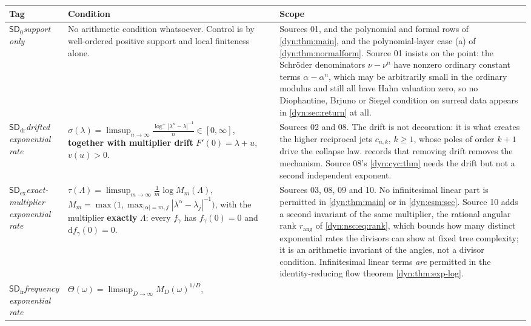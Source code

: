 \documentclass[11pt,letterpaper]{article}
\theoremstyle{definition}
\theoremstyle{remark}
\newcommand{\sdz}{\mathsf{SD}_{0}}
\newcommand{\sddr}{\mathsf{SD}_{\mathrm{dr}}}
\newcommand{\sdex}{\mathsf{SD}_{\mathrm{ex}}}
\newcommand{\sdfr}{\mathsf{SD}_{\mathrm{fr}}}
\newcommand{\rang}{r_{\mathrm{ang}}}
\numberwithin{equation}{section}
\begin{document}
\begin{longtable}{@{}P{0.12\textwidth}P{0.41\textwidth}P{0.40\textwidth}@{}}
\toprule
Tag & Condition & Scope\\
\midrule
\endhead
$\sdz$\newline \emph{support only}
&
No arithmetic condition whatsoever. Control is by well-ordered positive
support and local finiteness alone.
&
Sources 01, and the polynomial and formal rows of \cref{dyn:thm:main},
and the polynomial-layer case (a) of \cref{dyn:thm:normalform}. Source 01
insists on the point: the Schr\"oder denominators $\nu-\nu^{n}$ have
nonzero ordinary constant terms $\alpha-\alpha^{n}$, which may be
arbitrarily small in the ordinary modulus and still all have Hahn
valuation zero, so no Diophantine, Brjuno or Siegel condition on surreal
data appears in \cref{dyn:sec:return} at all.\\[4pt]
$\sddr$\newline \emph{drifted exponential rate}
&
$\displaystyle
\sigma(\lambda)=\limsup_{n\to\infty}
\frac{\log^{+}|\lambda^{n}-\lambda|^{-1}}{n}\in[0,\infty]$,
\textbf{together with multiplier drift} $F'(0)=\lambda+u$,
$v(u)>0$.
&
Sources 02 and 08. The drift is not decoration: it is what creates the
higher reciprocal jets $c_{n,k}$, $k\ge1$, whose poles of order $k+1$ drive
the collapse law.  records that removing drift removes
the mechanism. Source 08's \cref{dyn:cyc:thm} needs the drift but not a
second independent exponent.\\[4pt]
$\sdex$\newline \emph{exact-multiplier exponential rate}
&
$\displaystyle
\tau(\Lambda)=\limsup_{m\to\infty}\frac1m\log M_{m}(\Lambda)$,
$M_{m}=\max\bigl(1,\max_{|\alpha|=m,j}|\lambda^{\alpha}-\lambda_j|^{-1}\bigr)$,
with the multiplier \textbf{exactly} $\Lambda$: every
$f_\gamma$ has $f_\gamma(0)=0$ and $\mathrm df_\gamma(0)=0$.
&
Sources 03, 08, 09 and 10. No infinitesimal linear part is permitted in
\cref{dyn:thm:main} or in \cref{dyn:esm:sec}. Source 10 adds a second
invariant of the same multiplier, the rational angular rank $\rang$ of
\eqref{dyn:nsc:eq:rank}, which bounds how many distinct exponential rates
the divisors can show at fixed tree complexity; it is an arithmetic
invariant of the angles, not a divisor condition. Infinitesimal linear terms
\emph{are} permitted in the identity-reducing flow theorem
\cref{dyn:thm:exp-log}.\\[4pt]
$\sdfr$\newline \emph{frequency exponential rate}
&
$\displaystyle \Theta(\omega)=\limsup_{D\to\infty}M_{D}(\omega)^{1/D}$,

\end{longtable}
\end{document}
